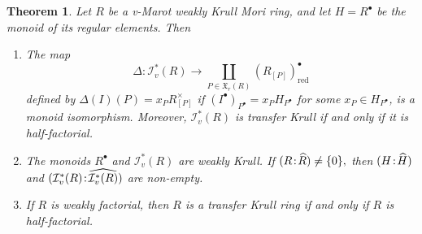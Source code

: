 \documentclass[a4paper, 10pt]{amsart}
\theoremstyle{plain}
\newtheorem{theorem}{Theorem}[section]
\theoremstyle{definition}
\theoremstyle{remark}
\newcommand{\DP}{\negthinspace : \negthinspace}
\numberwithin{equation}{section}
\begin{document}
\begin{theorem}\label{prop:height1}
    Let $R$ be a v-Marot weakly Krull Mori ring, and let $H=R^\bullet$ be the monoid of its regular elements. Then \begin{enumerate}[label=\textup(\normalfont\arabic*\textup)]
        \item The map \[\Delta\colon\mathcal{I}_v^*(R)\to \coprod_{P\in \mathfrak{X}_r(R)}(R_{[P]})^\bullet_{\mathrm{red}} \] defined by $\Delta(I)(P)=x_PR_{[P]}^\times$ if $(I^\bullet)_{P^\bullet}=x_PH_{P^\bullet}$ for some $x_P\in H_{P^\bullet}$, is a monoid isomorphism. Moreover, $\mathcal{I}^*_v(R)$ is transfer Krull if and only if it is half-factorial.
        \item The monoids $R^\bullet$ and $\mathcal{I}^*_v(R)$ are weakly Krull. If $(R\DP \widehat{R})\ne\{0\},$ then $(H\DP \widehat{H})$ and $(\mathcal{I}_v^*(R)\DP \widehat{\mathcal{I}_v^*(R)})$ are non-empty.
        \item If $R$ is weakly factorial, then $R$ is a transfer Krull ring if and only if $R$ is half-factorial.
    \end{enumerate}
\end{theorem}
\end{document}
